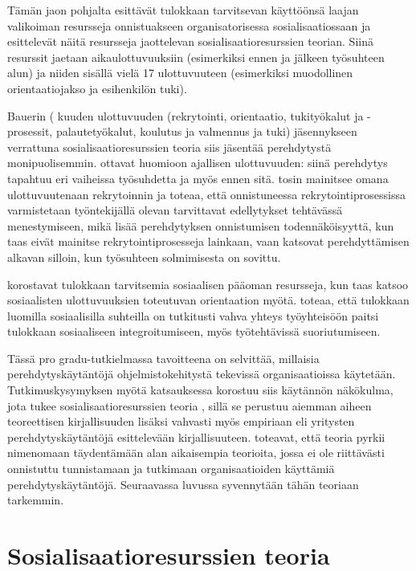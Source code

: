 \documentclass[utf8]{gradu3}
\begin{document}
Tämän jaon pohjalta \textcite{saks-gruman-2012} esittävät tulokkaan tarvitsevan käyttöönsä laajan valikoiman resursseja onnistuakseen organisatorisessa sosialisaatiossaan ja esittelevät näitä resursseja jaottelevan sosialisaatioresurssien teorian. Siinä resurssit jaetaan aikaulottuvuuksiin (esimerkiksi ennen ja jälkeen työsuhteen alun) ja niiden sisällä vielä 17 ulottuvuuteen (esimerkiksi muodollinen orientaatiojakso ja esihenkilön tuki).

Bauerin (\citeyear{bauer-2010} kuuden ulottuvuuden (rekrytointi, orientaatio, tukityökalut ja -prosessit, palautetyökalut, koulutus ja valmennus ja tuki) jäsennykseen verrattuna sosialisaatioresurssien teoria \parencite{saks-gruman-2012} siis jäsentää perehdytystä monipuolisemmin. \textcite{saks-gruman-2012} ottavat huomioon ajallisen ulottuvuuden: siinä perehdytys tapahtuu eri vaiheissa työsuhdetta ja myös ennen sitä. \textcite{bauer-2010} tosin mainitsee omana ulottuvuutenaan rekrytoinnin ja toteaa, että onnistuneessa rekrytointiprosessissa varmistetaan työntekijällä olevan tarvittavat edellytykset tehtävässä menestymiseen, mikä lisää perehdytyksen onnistumisen todennäköisyyttä, kun taas \textcite{saks-gruman-2012} eivät mainitse rekrytointiprosesseja lainkaan, vaan katsovat perehdyttämisen alkavan silloin, kun työsuhteen solmimisesta on sovittu. 

\textcite{saks-gruman-2012} korostavat tulokkaan tarvitsemia sosiaalisen pääoman resursseja, kun taas \textcite{bauer-2010} katsoo sosiaalisten ulottuvuuksien toteutuvan orientaation myötä. \textcite{zhao-2022} toteaa, että tulokkaan luomilla sosiaalisilla suhteilla on tutkitusti vahva yhteys työyhteisöön paitsi tulokkaan sosiaaliseen integroitumiseen, myös työtehtävissä suoriutumiseen.

Tässä pro gradu-tutkielmassa tavoitteena on selvittää, millaisia perehdytyskäytäntöjä ohjelmistokehitystä tekevissä organisaatioissa käytetään. Tutkimuskysymyksen myötä katsauksessa korostuu siis käytännön näkökulma, jota tukee sosialisaatioresurssien teoria \parencite{saks-gruman-2012}, sillä se perustuu aiemman aiheen teoreettisen kirjallisuuden lisäksi vahvasti myös empiriaan eli yritysten perehdytyskäytäntöjä esittelevään kirjallisuuteen. \textcite{saks-gruman-2012} toteavat, että teoria pyrkii nimenomaan täydentämään alan aikaisempia teorioita, jossa ei ole riittävästi onnistuttu tunnistamaan ja tutkimaan organisaatioiden käyttämiä perehdytyskäytäntöjä. Seuraavassa luvussa syvennytään tähän teoriaan tarkemmin.

\section{Sosialisaatioresurssien teoria}
\label{luku-SRT-teoria}
\end{document}
